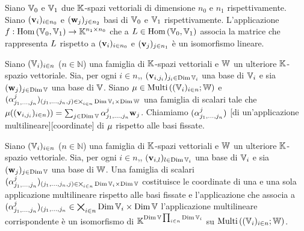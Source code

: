 \begin{Theorem}
	Siano $\mathbb{V}_0$ e $\mathbb{V}_1$ due $\mathbb{K}$-spazi vettoriali di dimensione $n_0$ e $n_1$ rispettivamente. Siano $(\mathbf{v}_i)_{i \in n_0}$ e $(\mathbf{w}_j)_{j \in n_2}$ basi di $\mathbb{V}_0$ e $\mathbb{V}_1$ rispettivamente. L'applicazione $f: \text{Hom}\left ( \mathbb{V}_0, \mathbb{V}_1 \right ) \rightarrow \mathbb{K}^{n_1 \times n_0}$ che a $L \in \text{Hom}\left ( \mathbb{V}_0, \mathbb{V}_1 \right )$ associa la matrice che rappresenta $L$ rispetto a $(\mathbf{v}_i)_{i \in n_0}$ e $(\mathbf{v}_j)_{j \in n_1}$ \`e un isomorfismo lineare. 
\end{Theorem}
\Proof
\begin{Definition}
	Siano $(\mathbb{V}_i)_{i \in n}$ ($n \in \mathbb{N}$) una famiglia di $\mathbb{K}$-spazi vettoriali e $\mathbb{W}$ un ulteriore $\mathbb{K}$-spazio vettoriale. Sia, per ogni $i \in n$,, $(\mathbf{v}_{i,j_i})_{j_i \in \operatorname{\operatorname{Dim}}{\mathbb{V}_i}}$ una base di $\mathbb{V}_i$ e sia $(\mathbf{w}_j)_{j \in \operatorname{\operatorname{Dim}}{\mathbb{V}}}$ una base di $\mathbb{V}$. Siano $\mu \in \text{Multi}\left ( (\mathbb{V}_i)_{i \in n} ; \mathbb{W} \right )$ e $(\alpha_{j_1,...,j_n}^j)_{(j_1,...,j_n,j) \in \bigtimes_{i \in n} \operatorname{\operatorname{Dim}}{\mathbb{V}_i} \times \operatorname{\operatorname{Dim}}{\mathbb{W}}}$ una famiglia di scalari tale che $\mu((\mathbf{v}_{i,j_i})_{i \in n})) = \sum_{j \in \operatorname{\operatorname{Dim}}{\mathbb{V}}} \alpha_{j_1,...,j_n}^j \mathbf{w}_j$. Chiamiamo $(\alpha_{j_1,...,j_n}^j)$ [di un'applicazione multilineare][coordinate] di $\mu$ rispetto alle basi fissate.
\end{Definition}
\begin{Theorem}
	Siano $(\mathbb{V}_i)_{i \in n}$ ($n \in \mathbb{N}$) una famiglia di $\mathbb{K}$-spazi vettoriali e $\mathbb{W}$ un ulteriore $\mathbb{K}$-spazio vettoriale. Sia, per ogni $i \in n$,, $(\mathbf{v}_{i,l})_{l \in \operatorname{\operatorname{Dim}}{\mathbb{V}_i}}$ una base di $\mathbb{V}_i$ e sia $(\mathbf{w}_j)_{j \in \operatorname{\operatorname{Dim}}{\mathbb{V}}}$ una base di $\mathbb{W}$. Una famiglia di scalari $(\alpha_{j_1,...,j_n}^j)_{(j_1,...,j_n,j) \in \bigtimes_{i \in n} \operatorname{\operatorname{Dim}}{\mathbb{V}_i} \times \operatorname{\operatorname{Dim}}{\mathbb{V}}}$ costituisce le coordinate di una e una sola applicazione multilineare rispetto alle basi fissate e l'applicazione che associa a $(\alpha_{j_1,...,j_n}^j)_{(j_1,...,j_n} \in \bigtimes_{i \in n} \operatorname{\operatorname{Dim}}{\mathbb{V}_i} \times \operatorname{\operatorname{Dim}}{\mathbb{V}}$ l'applicazione multilineare corrispondente \`e un isomorfismo di $\mathbb{K}^{\operatorname{\operatorname{Dim}}{\mathbb{V}} \prod_{i \in n}\operatorname{\operatorname{Dim}}{\mathbb{V}_i}}$ su $\text{Multi}\left ( (\mathbb{V}_i)_{i \in n} ; \mathbb{W} \right )$.
\end{Theorem} 
